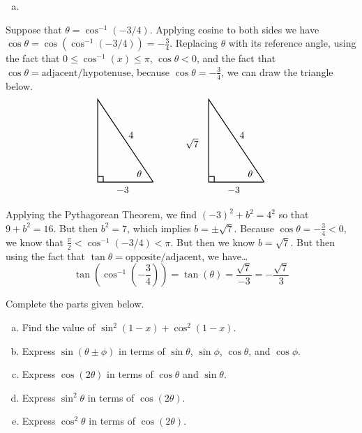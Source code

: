 \documentclass[12pt,letterpaper]{exam}
\begin{document}
\begin{questions}
{%
\begin{enumerate}[(b)]
\item 
\end{enumerate}
\begin{minipage}[c]{0.45\textwidth}
Suppose that $\theta= \cos^{-1}(-3/4)$. Applying cosine to both sides we have $\cos \theta= \cos \left( \cos^{-1}(-3/4) \right)= -\frac{3}{4}$. Replacing $\theta$ with its reference angle, using the fact that $0 \leq \cos^{-1}(x) \leq \pi$, $\cos \theta < 0$, and the fact that $\cos \theta= \text{adjacent}/\text{hypotenuse}$, because $\cos \theta= -\frac{3}{4}$, we can draw the triangle below.
	\[
	\begin{tikzpicture}
	\draw[line width=0.03cm] (0,0) -- (-2,0) -- (-2,3) -- (0,0);
	\draw[line width=0.03cm] (-1.8,0) -- (-1.8,0.2) -- (-2,0.2);
	\node at (-1.1,-0.3) {$-3$};
	\node at (-0.8,1.7) {$4$};
	\node at (-0.5,0.3) {$\theta$};

	\tikzset{shift={(4,0)}}

	\draw[line width=0.03cm] (0,0) -- (-2,0) -- (-2,3) -- (0,0);
	\draw[line width=0.03cm] (-1.8,0) -- (-1.8,0.2) -- (-2,0.2);
	\node at (-1.1,-0.3) {$-3$};
	\node at (-0.8,1.7) {$4$};
	\node at (-2.6,1.4) {$\sqrt{7}$};
	\node at (-0.5,0.3) {$\theta$};
	\end{tikzpicture}
	\]
\end{minipage} \hspace{1cm} \begin{minipage}[c]{0.45\textwidth}
Applying the Pythagorean Theorem, we find $(-3)^2 + b^2= 4^2$ so that $9 + b^2= 16$. But then $b^2= 7$, which implies $b= \pm \sqrt{7}$. Because $\cos \theta= -\frac{3}{4} < 0$, we know that $\frac{\pi}{2} < \cos^{-1}(-3/4) < \pi$. But then we know $b= \sqrt{7}$. But then using the fact that $\tan \theta= \text{opposite}/\text{adjacent}$, we have\dots
	\[
	\tan \!\left( \cos^{-1} \left( -\dfrac{3}{4} \right) \right)= \tan \left( \theta \right)= \dfrac{\sqrt{7}}{-3}= -\dfrac{\sqrt{7}}{3}
	\]
\vspace{1.9cm}
\end{minipage}
}



\newpage
\question[10] Complete the parts given below.
	\begin{enumerate}[(a)]
	\item Find the value of $\sin^2(1 - x) + \cos^2(1 - x)$.
	\item Express $\sin(\theta \pm \phi)$ in terms of $\sin \theta$, $\sin \phi$, $\cos \theta$, and $\cos \phi$. 
	\item Express $\cos(2\theta)$ in terms of $\cos \theta$ and $\sin \theta$. 
	\item Express $\sin^2 \theta$ in terms of $\cos(2\theta)$.
	\item Express $\cos^2 \theta$ in terms of $\cos(2\theta)$. 
	\end{enumerate} \pspace


\end{questions}
\end{document}
